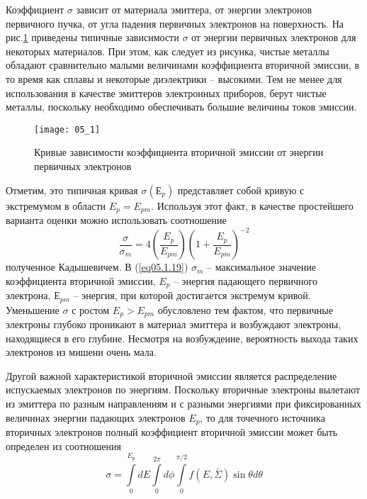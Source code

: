 Коэффициент \( \sigma \) зависит от материала эмиттера, от энергии электронов 
первичного пучка, от угла падения первичных электронов на поверхность. На 
рис.\ref{img05.1} приведены типичные зависимости \( \sigma \) от энергии 
первичных электронов для некоторых материалов. При этом, как следует из 
рисунка, чистые металлы обладают сравнительно малыми величинами коэффициента 
вторичной эмиссии, в то время как сплавы и некоторые диэлектрики -- высокими. 
Тем не менее для использования в качестве эмиттеров электронных приборов, 
берут чистые металлы, поскольку необходимо обеспечивать большие величины токов 
эмиссии.
\begin{figure}[h]
    \center
    \texttt{[image: 05\_1]}
    \caption{Кривые зависимости коэффициента вторичной эмиссии от энергии 
        первичных электронов}
    \label{img05.1}
\end{figure}

Отметим, это типичная кривая \( \sigma(Е_p) \) представляет собой кривую с 
экстремумом в области \( E_p = E_{pm} \). Используя этот факт, в качестве 
простейшего варианта оценки можно использовать соотношение
\begin{equation}
    \frac{\sigma}{\sigma_m} = 4\left( \frac{E_p}{E_{pm}} \right)
        \left( 1 + \frac{E_p}{E_{pm}} \right)^{-2}
    \label{eq05.1.19}
\end{equation}
полученное Кадышевичем. В (\ref{eq05.1.19}) \( \sigma_{m} \) -- максимальное 
значение коэффициента вторичной эмиссии, \( E_p \) -- энергия падающего 
первичного электрона, \( Е_{pm} \) -- энергия, при которой достигается 
экстремум кривой. Уменьшение \( \sigma \) с ростом \( E_p > E_{pm} \) 
обусловлено тем фактом, что первичные электроны глубоко проникают в материал 
эмиттера и возбуждают электроны, находящиеся в его глубине. Несмотря на 
возбуждение, вероятность выхода таких электронов из мишени очень мала.

Другой важной характеристикой вторичной эмиссии является распределение 
испускаемых электронов по энергиям. Поскольку вторичные электроны вылетают 
из эмиттера по разным направлениям и с разными энергиями при фиксированных 
величинах энергии падающих электронов \( E_p \), то для точечного источника 
вторичных электронов полный коэффициент вторичной эмиссии может быть определен 
из соотношения
\begin{equation}
    \sigma = \int\limits_{0}^{E_p} dE \int\limits_{0}^{2\pi} d\phi 
        \int\limits_{0}^{\pi/2} f(E,\bar{\Sigma})\sin\theta d\theta
    \label{eq05.1.20}
\end{equation}


